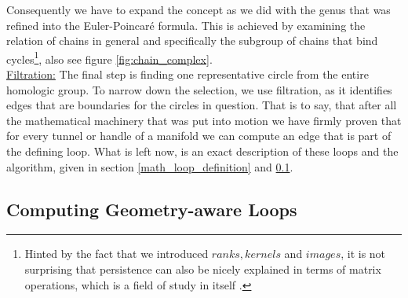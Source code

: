 Consequently we have to expand the concept as we did with the genus that was refined into the Euler-Poincaré formula.
This is achieved by examining the relation of chains in general and specifically the subgroup of chains that bind cycles\footnote{ Hinted by the fact that we introduced $ranks, kernels$ and $images$, it is not surprising that persistence can also be nicely explained in terms of matrix operations, which is a field of study in itself \citep[see chapters IV-3 and VI-1 in][]{Edelsbrunner2006}.}, also see figure \ref{fig:chain_complex}.\\
\underline{Filtration:} The final step is finding one representative circle from the entire homologic group.
To narrow down the selection, we use filtration, as it identifies edges that are boundaries for the circles in question.
That is to say, that after all the mathematical machinery that was put into motion we have firmly proven that for every tunnel or handle of a manifold we can compute an edge that is part of the defining loop.
What is left now, is an exact description of these loops and the algorithm, given in section \ref{math_loop_definition} and \ref{math_loop_computation}.

\subsection{Computing Geometry-aware Loops}
\label{math_loop_computation}

